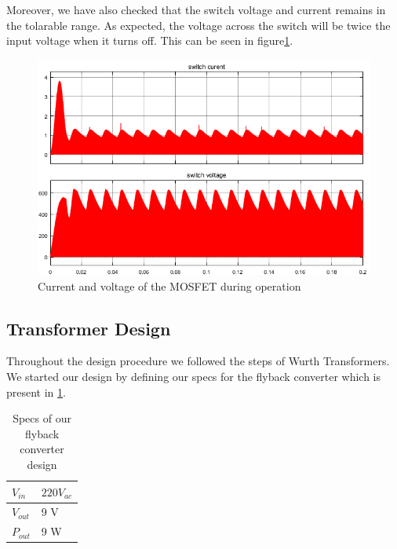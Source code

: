 \documentclass[12pt]{article}
\begin{document}
Moreover, we have also checked that the switch voltage and current remains in the tolarable range. As expected, the voltage across the switch will be twice the input voltage when it turns off. This can be seen in figure\ref{fig:switch}.

\begin{figure}[H]
    \centering
    \includegraphics[width=15 cm]{switch_stress_snubbereffect}
    \caption{Current and voltage of the MOSFET during operation}
    \label{fig:switch}
\end{figure}

\subsection{Transformer Design}

Throughout the design procedure we followed the steps of Wurth Transformers.\\
We started our design by defining our specs for the flyback converter which is present in \ref{tab:spec}.
\begin{table}[H]
\centering

\label{tab:spec}
\begin{tabular}{|l|l|}
\hline
$V_{in} $ & $220 V_{ac}$ \\ \hline
$V_{out}$ & 9 V           \\ \hline
$P_{out}$ & 9 W           \\ \hline
\end{tabular}
\caption{Specs of our flyback converter design}
\end{table}
\end{document}
